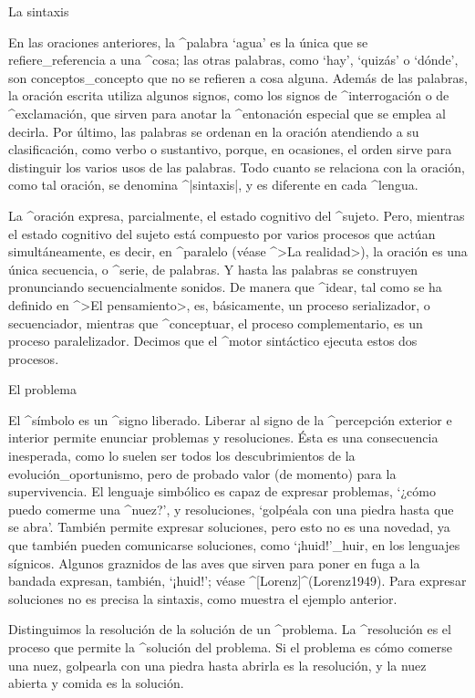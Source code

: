 \Section La sintaxis

En las oraciones anteriores, la ^{palabra} `agua' es la única que se
refiere_{referencia} a una ^{cosa}; las otras palabras, como `hay',
`quizás' o `dónde', son conceptos_{concepto} que no se refieren a cosa
alguna. Además de las palabras, la oración escrita utiliza algunos
signos, como los signos de ^{interrogación} o de ^{exclamación}, que
sirven para anotar la ^{entonación} especial que se emplea al decirla.
Por último, las palabras se ordenan en la oración atendiendo a su
clasificación, como verbo o sustantivo, porque, en ocasiones, el orden
sirve para distinguir los varios usos de las palabras. Todo cuanto se
relaciona con la oración, como tal oración, se denomina ^|sintaxis|, y
es diferente en cada ^{lengua}.


La ^{oración} expresa, parcialmente, el estado cognitivo del ^{sujeto}.
Pero, mientras el estado cognitivo del sujeto está compuesto por varios
procesos que actúan simultáneamente, es decir, en ^{paralelo} (véase
^>La realidad>), la oración es una única secuencia, o ^{serie}, de
palabras. Y hasta las palabras se construyen pronunciando
secuencialmente sonidos. De manera que ^{idear}, tal como se ha definido
en ^>El pensamiento>, es, básicamente, un proceso serializador, o
secuenciador, mientras que ^{conceptuar}, el proceso complementario, es
un proceso paralelizador. Decimos que el ^{motor sintáctico} ejecuta
estos dos procesos.


\Section El problema

El ^{símbolo} es un ^{signo} liberado. Liberar al signo de la
^{percepción} exterior e interior permite enunciar problemas y
resoluciones. Ésta es una consecuencia inesperada, como lo suelen ser
todos los descubrimientos de la evolución_{oportunismo}, pero de probado
valor (de momento) para la supervivencia. El lenguaje simbólico es capaz
de expresar problemas, `¿cómo puedo comerme una ^{nuez}?', y
resoluciones, `golpéala con una piedra hasta que se abra'. También
permite expresar soluciones, pero esto no es una novedad, ya que también
pueden comunicarse soluciones, como `¡huid!'_{huir}, en los lenguajes
sígnicos. Algunos graznidos de las aves que sirven para poner en fuga a
la bandada expresan, también, `¡huid!'; véase ^[Lorenz]^(Lorenz1949).
Para expresar soluciones no es precisa la sintaxis, como muestra el
ejemplo anterior.

Distinguimos la resolución de la solución de un ^{problema}. La
^{resolución} es el proceso que permite la ^{solución} del problema. Si
el problema es cómo comerse una nuez, golpearla con una piedra hasta
abrirla es la resolución, y la nuez abierta y comida es la solución.

